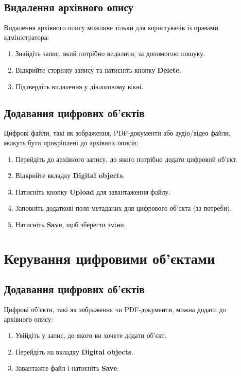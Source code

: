 \documentclass[14pt,a4paper]{article}
\begin{document}
\subsection{Видалення архівного опису}
Видалення архівного опису можливе тільки для користувачів із правами адміністратора:
\begin{enumerate}
	\item Знайдіть запис, який потрібно видалити, за допомогою пошуку.
	\item Відкрийте сторінку запису та натисніть кнопку \textbf{Delete}.
	\item Підтвердіть видалення у діалоговому вікні.
\end{enumerate}

\subsection{Додавання цифрових об'єктів}
Цифрові файли, такі як зображення, PDF-документи або аудіо/відео файли, можуть бути прикріплені до архівних описів:
\begin{enumerate}
	\item Перейдіть до архівного запису, до якого потрібно додати цифровий об'єкт.
	\item Відкрийте вкладку \textbf{Digital objects}.
	\item Натисніть кнопку \textbf{Upload} для завантаження файлу.
	\item Заповніть додаткові поля метаданих для цифрового об'єкта (за потреби).
	\item Натисніть \textbf{Save}, щоб зберегти зміни.
\end{enumerate}


\section{Керування цифровими об'єктами}
\subsection{Додавання цифрових об'єктів}
Цифрові об'єкти, такі як зображення чи PDF-документи, можна додати до архівного опису:
\begin{enumerate}
	\item Увійдіть у запис, до якого ви хочете додати об'єкт.
	\item Перейдіть на вкладку \textbf{Digital objects}.
	\item Завантажте файл і натисніть \textbf{Save}.
\end{enumerate}
\end{document}
